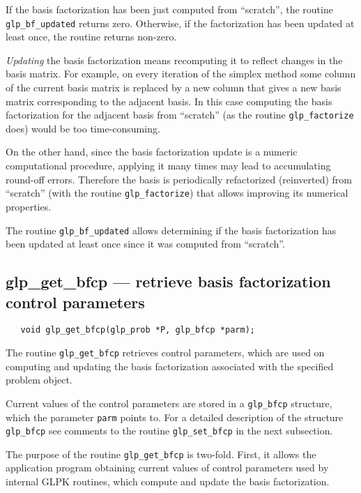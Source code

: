 \returns

If the basis factorization has been just computed from ``scratch'', the
routine \verb|glp_bf_updated| returns zero. Otherwise, if the
factorization has been updated at least once, the routine returns
non-zero.


{\it Updating} the basis factorization means recomputing it to reflect
changes in the basis matrix. For example, on every iteration of the
simplex method some column of the current basis matrix is replaced by
a new column that gives a new basis matrix corresponding to the
adjacent basis. In this case computing the basis factorization for the
adjacent basis from ``scratch'' (as the routine \verb|glp_factorize|
does) would be too time-consuming.

On the other hand, since the basis factorization update is a numeric
computational procedure, applying it many times may lead to
accumulating round-off errors. Therefore the basis is periodically
refactorized (reinverted) from ``scratch'' (with the routine
\verb|glp_factorize|) that allows improving its numerical properties.

The routine \verb|glp_bf_updated| allows determining if the basis
factorization has been updated at least once since it was computed from
``scratch''.

\subsection{glp\_get\_bfcp --- retrieve basis factorization control
parameters}

\synopsis

\begin{verbatim}
   void glp_get_bfcp(glp_prob *P, glp_bfcp *parm);
\end{verbatim}

\description

The routine \verb|glp_get_bfcp| retrieves control parameters, which are
used on computing and updating the basis factorization associated with
the specified problem object.

Current values of the control parameters are stored in
a \verb|glp_bfcp| structure, which the parameter \verb|parm| points to.
For a detailed description of the structure \verb|glp_bfcp| see
comments to the routine \verb|glp_set_bfcp| in the next subsection.


The purpose of the routine \verb|glp_get_bfcp| is two-fold. First, it
allows the application program obtaining current values of control
parameters used by internal GLPK routines, which compute and update the
basis factorization.

